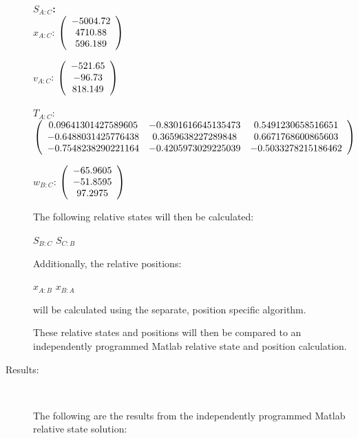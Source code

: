\begin{description}
\Large{\textbf{$S_{A:C}$:}} \normalsize \\

$x_{A:C}$: $\left( \begin{array} {ccc}  -5004.72 \\    4710.88 \\    596.189
\end{array} \right)\\ \\$

$v_{A:C}$:  $\left( \begin{array} {ccc}  -521.65 \\     -96.73 \\    818.149
\end{array} \right)\\ \\$

$T_{A:C}$: $\left( \begin{array} {ccc}
0.09641301427589605 & -0.8301616645135473 & 0.5491230658516651 \\
-0.6488031425776438 & 0.3659638227289848 & 0.6671768600865603 \\
 -0.7548238290221164 & -0.4205973029225039 & -0.5033278215186462
\end{array} \right)\\ \\$

$w_{B:C}$:  $\left( \begin{array} {ccc} -65.9605 \\   -51.8595 \\    97.2975
\end{array} \right)\\ \\$

The following relative states will then be calculated:

$S_{B:C}$
$S_{C:B}$

Additionally, the relative positions:

$x_{A:B}$
$x_{B:A}$

will be calculated using the separate, position specific algorithm.

These relative states and positions will then be compared to an
independently programmed Matlab relative state and position calculation.

\item[Results:] \ \newline

The following are the results from the independently programmed Matlab relative state
solution:


\end{description}

